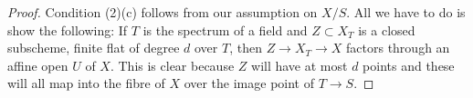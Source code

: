 \documentclass[10pt,a4paper]{amsart}
\theoremstyle{plain}
\theoremstyle{definition}
\theoremstyle{remark}
\numberwithin{equation}{subsection}
\begin{document}
\begin{proof}
\medskip\noindent
Condition (2)(c) follows from our assumption on $X/S$. All we have
to do is show the following: If $T$ is the spectrum of a field
and $Z \subset X_T$ is a closed subscheme, finite flat of degree
$d$ over $T$, then $Z \to X_T \to X$ factors through an affine open
$U$ of $X$. This is clear because $Z$ will have at most $d$ points
and these will all map into the fibre of $X$ over the image point
of $T \to S$.
\end{proof}
\end{document}
